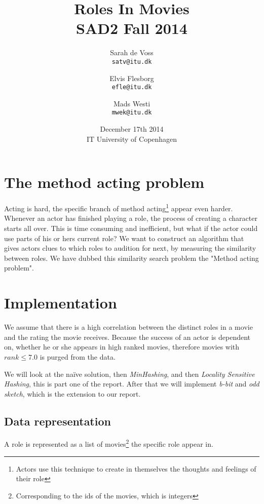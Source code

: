 \documentclass[a4paper,11pt]{article}
\begin{document}
\setlength{\parindent}{0cm}
\setlength{\unitlength}{1mm}
\date{December 17th 2014\\ IT University of Copenhagen}
\title{Roles In Movies\\SAD2 Fall 2014}

\author{Sarah de Voss\\
\texttt{satv@itu.dk}
\and Elvis Flesborg\\
\texttt{efle@itu.dk}
\and Mads Westi\\
\texttt{mwek@itu.dk}}
\clearpage\maketitle
\newpage
\thispagestyle{empty}
\setcounter{page}{1}
\tableofcontents
\newpage

\section{The method acting problem}
Acting is hard, the specific branch of method acting\footnote{Actors use this technique to create in themselves the thoughts and feelings of their role} appear even harder. Whenever an actor has finished playing a role, the process of creating a character starts all over. This is time consuming and inefficient, but what if the actor could use parts of his or hers current role? We want to construct an algorithm that gives actors clues to which roles to audition for next, by measuring the similarity between roles. We have dubbed this similarity search problem the "Method acting problem".


\section{Implementation}
We assume that there is a high correlation between the distinct roles in a movie and the rating the movie receives. Because the success of an actor is dependent on, whether he or she appears in high ranked movies, therefore movies with $rank \leq 7.0$ is purged from the data.

We will look at the naïve solution, then \emph{MinHashing}, and then \emph{Locality Sensitive Hashing}, this is part one of the report. After that we will implement \emph{b-bit} and \emph{odd sketch}, which is the extension to our report.


\subsection{Data representation}
A role is represented as a list of movies\footnote{Corresponding to the ids of the movies, which is integers} the specific role appear in.
\end{document}
